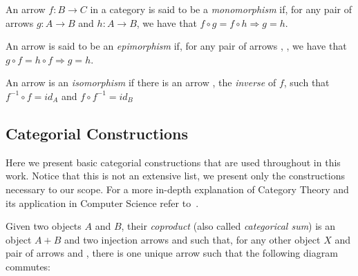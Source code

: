 \begin{definition} An arrow \mbox{$f : B \rightarrow C$} in a category  is said to be a \emph{monomorphism} if, for any pair of arrows $g : A \rightarrow B$ and $h : A \rightarrow B$, we have that $f \circ g = f \circ h \Rightarrow g = h$.


  An arrow  is said to be an \emph{epimorphism} if, for any pair of arrows , , we have that \mbox{$g \circ f = h \circ f \Rightarrow g = h$}.


  An arrow  is an \emph{isomorphism} if there is an arrow , the \emph{inverse} of $f$, such that \mbox{$f^{-1} \circ f = id_A$} and \mbox{$f \circ f^{-1} = id_B$}


\end{definition}

\subsection{Categorial Constructions}

Here we present basic categorial constructions that are used throughout in this work. Notice that this is not an extensive list, we present only the constructions necessary to our scope. For a more in-depth explanation of Category Theory and its application in Computer Science refer to~\cite{Pierce1991}.

\begin{definition}[Coproduct] Given two objects $A$ and $B$, their \emph{coproduct} (also called \emph{categorical sum}) is an object $A+B$ and two injection arrows  and  such that, for any other object $X$ and pair of arrows  and , there is one unique arrow  such that the following diagram commutes:


\end{definition}


